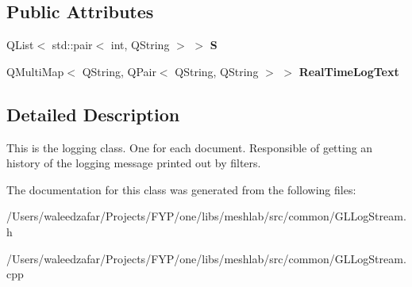 \subsection*{Public Attributes}
\begin{DoxyCompactItemize}
\item 
\mbox{\label{class_g_l_log_stream_af225f034f2b36a6a17714ae815862fee}} 
Q\+List$<$ std\+::pair$<$ int, Q\+String $>$ $>$ {\bfseries S}
\item 
\mbox{\label{class_g_l_log_stream_a11fd4ac710f3d5a40f00b1dd400c2e2c}} 
Q\+Multi\+Map$<$ Q\+String, Q\+Pair$<$ Q\+String, Q\+String $>$ $>$ {\bfseries Real\+Time\+Log\+Text}
\end{DoxyCompactItemize}


\subsection{Detailed Description}
This is the logging class. One for each document. Responsible of getting an history of the logging message printed out by filters. 

The documentation for this class was generated from the following files\+:\begin{DoxyCompactItemize}
\item 
/\+Users/waleedzafar/\+Projects/\+F\+Y\+P/one/libs/meshlab/src/common/G\+L\+Log\+Stream.\+h\item 
/\+Users/waleedzafar/\+Projects/\+F\+Y\+P/one/libs/meshlab/src/common/G\+L\+Log\+Stream.\+cpp\end{DoxyCompactItemize}
